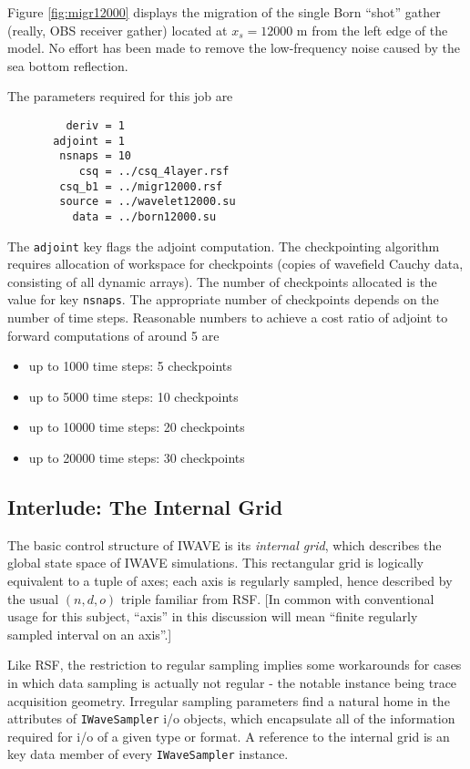 Figure \ref{fig:migr12000} displays the migration of the single
Born ``shot'' gather (really, OBS receiver gather) located at $x_s = 12000$ m from
the left edge of the model. No effort has been made to remove the
low-frequency noise caused by the sea bottom reflection.


The parameters required for this job are
\begin{verbatim}
         deriv = 1
       adjoint = 1
        nsnaps = 10
           csq = ../csq_4layer.rsf
        csq_b1 = ../migr12000.rsf
        source = ../wavelet12000.su
          data = ../born12000.su
\end{verbatim}

The {\tt adjoint} key flags the adjoint computation. The checkpointing
algorithm requires allocation of workspace for checkpoints (copies of
wavefield Cauchy data, consisting of all dynamic arrays).  The number
of checkpoints allocated is the value for key {\tt nsnaps}. The
appropriate number of checkpoints depends on the number of time
steps. Reasonable numbers to achieve a cost ratio of adjoint to
forward computations of around 5 are
\begin{itemize}
\item up to 1000 time steps: 5 checkpoints
\item up to 5000 time steps: 10 checkpoints
\item up to 10000 time steps: 20 checkpoints
\item up to 20000 time steps: 30 checkpoints
\end{itemize}

\subsection{Interlude: The Internal Grid}

The basic control structure of IWAVE is its {\em internal grid}, which
describes the global state space of IWAVE simulations. This
rectangular grid is logically equivalent to a tuple of axes; each axis
is regularly sampled, hence described by the usual $(n,d,o)$ triple
familiar from RSF. [In common with conventional usage for this
subject, ``axis'' in this discussion will mean ``finite regularly
sampled interval on an axis''.]

Like RSF, the restriction to regular sampling implies some workarounds
for cases in which data sampling is actually not regular - the notable
instance being trace acquisition geometry. Irregular
sampling parameters find a natural home in the attributes of {\tt IWaveSampler}
i/o objects, which encapsulate all of the information required for i/o
of a given type or format. A reference to the internal grid is an key data member of
every {\tt IWaveSampler} instance.

